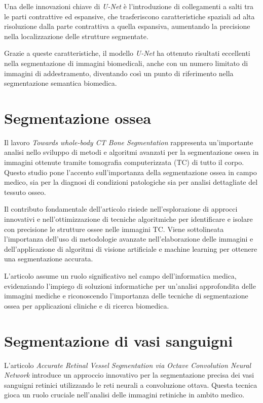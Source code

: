 Una delle innovazioni chiave di \textit{U-Net} è l'introduzione di collegamenti a salti tra le parti
contrattive ed espansive, che trasferiscono caratteristiche spaziali ad alta risoluzione dalla parte
contrattiva a quella espansiva, aumentando la precisione nella localizzazione delle strutture
segmentate.

Grazie a queste caratteristiche, il modello \textit{U-Net} ha ottenuto risultati eccellenti nella
segmentazione di immagini biomedicali, anche con un numero limitato di immagini di addestramento,
diventando così un punto di riferimento nella segmentazione semantica biomedica.




\section{Segmentazione ossea} \label{sec:segmentazione_ossea}

Il lavoro \textit{Towards whole-body CT Bone Segmentation} \cite{10.1007/978-3-662-56537-7_59}
rappresenta un'importante analisi nello sviluppo di metodi e algoritmi avanzati per la segmentazione
ossea in immagini ottenute tramite tomografia computerizzata (TC) di tutto il corpo. Questo studio
pone l'accento sull'importanza della segmentazione ossea in campo medico, sia per la diagnosi di
condizioni patologiche sia per analisi dettagliate del tessuto osseo.

Il contributo fondamentale dell'articolo risiede nell'esplorazione di approcci innovativi e
nell'ottimizzazione di tecniche algoritmiche per identificare e isolare con precisione le strutture
ossee nelle immagini TC. Viene sottolineata l'importanza dell'uso di metodologie avanzate
nell'elaborazione delle immagini e dell'applicazione di algoritmi di visione artificiale e machine
learning per ottenere una segmentazione accurata.

L'articolo assume un ruolo significativo nel campo dell'informatica medica, evidenziando l'impiego
di soluzioni informatiche per un'analisi approfondita delle immagini mediche e riconoscendo
l'importanza delle tecniche di segmentazione ossea per applicazioni cliniche e di ricerca biomedica.


\section{Segmentazione di vasi sanguigni} \label{sec:segmentazione_vasi_sanguigni}

L'articolo \textit{Accurate Retinal Vessel Segmentation via Octave Convolution Neural Network}
\cite{fan2020accurate} introduce un approccio innovativo per la segmentazione precisa dei vasi
sanguigni retinici utilizzando le reti neurali a convoluzione ottava. Questa tecnica gioca un ruolo
cruciale nell'analisi delle immagini retiniche in ambito medico.

